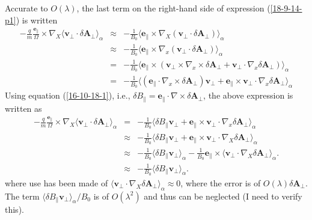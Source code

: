 \documentclass{article}
\begin{document}
Accurate to $O (\lambda)$, the last term on the right-hand side of expression
(\ref{18-9-14-p1}) is written
\begin{eqnarray*}
  - \frac{q}{m}  \frac{\mathbf{e}_{\parallel}}{\Omega} \times \nabla_X \langle
  \mathbf{v}_{\perp} \cdot \delta \mathbf{A}_{\perp} \rangle_{\alpha} &
  \approx & - \frac{1}{B_0} \langle \mathbf{e}_{\parallel} \times \nabla_X
  (\mathbf{v}_{\perp} \cdot \delta \mathbf{A}_{\perp}) \rangle_{\alpha}\\
  & \approx & - \frac{1}{B_0} \langle \mathbf{e}_{\parallel} \times \nabla_x
  (\mathbf{v}_{\perp} \cdot \delta \mathbf{A}_{\perp}) \rangle_{\alpha}\\
  & = & - \frac{1}{B_0} \langle \mathbf{e}_{\parallel} \times
  (\mathbf{v}_{\perp} \times \nabla_x \times \delta \mathbf{A}_{\perp}
  +\mathbf{v}_{\perp} \cdot \nabla_x \delta \mathbf{A}_{\perp})
  \rangle_{\alpha}\\
  & = & - \frac{1}{B_0} \langle (\mathbf{e}_{\parallel} \cdot \nabla_x \times
  \delta \mathbf{A}_{\perp}) \mathbf{v}_{\perp} +\mathbf{e}_{\parallel} \times
  \mathbf{v}_{\perp} \cdot \nabla_x \delta \mathbf{A}_{\perp} \rangle_{\alpha}
\end{eqnarray*}
Using equation (\ref{16-10-18-1}), i.e., $\delta B_{\parallel}
=\mathbf{e}_{\parallel} \cdot \nabla \times \delta \mathbf{A}_{\perp}$, the
above expression is written as
\begin{eqnarray}
  - \frac{q}{m}  \frac{\mathbf{e}_{\parallel}}{\Omega} \times \nabla_X \langle
  \mathbf{v}_{\perp} \cdot \delta \mathbf{A}_{\perp} \rangle_{\alpha} & = & -
  \frac{1}{B_0} \langle \delta B_{\parallel} \mathbf{v}_{\perp}
  +\mathbf{e}_{\parallel} \times \mathbf{v}_{\perp} \cdot \nabla_x \delta
  \mathbf{A}_{\perp} \rangle_{\alpha} \nonumber\\
  & \approx & - \frac{1}{B_0} \langle \delta B_{\parallel} \mathbf{v}_{\perp}
  +\mathbf{e}_{\parallel} \times \mathbf{v}_{\perp} \cdot \nabla_X \delta
  \mathbf{A}_{\perp} \rangle_{\alpha} \nonumber\\
  & \approx & - \frac{1}{B_0} \langle \delta B_{\parallel} \mathbf{v}_{\perp}
  \rangle_{\alpha} - \frac{1}{B_0} \mathbf{e}_{\parallel} \times \langle
  \mathbf{v}_{\perp} \cdot \nabla_X \delta \mathbf{A}_{\perp} \rangle_{\alpha}
  . \nonumber\\
  & \approx & - \frac{1}{B_0} \langle \delta B_{\parallel} \mathbf{v}_{\perp}
  \rangle_{\alpha} .  \label{16-10-18-p5}
\end{eqnarray}
where use has been made of $\langle \mathbf{v}_{\perp} \cdot \nabla_X \delta
\mathbf{A}_{\perp} \rangle_{\alpha} \approx 0$, where the error is of $O
(\lambda) \delta \mathbf{A}_{\perp}$. The term $\langle \delta B_{\parallel}
\mathbf{v}_{\perp} \rangle_{\alpha} / B_0$ is of $O (\lambda^2)$ and thus can
be neglected (I need to verify this).
\end{document}

